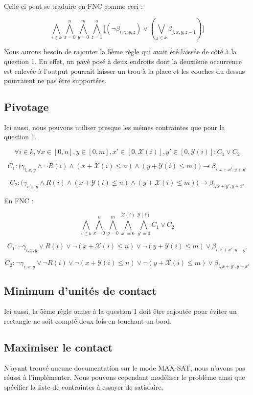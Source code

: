 \documentclass[a4paper]{article}
\begin{document}
Celle-ci peut se traduire en FNC comme ceci :

$$
\bigwedge_{i \in k}
  \bigwedge_{x=0}^{n} \bigwedge_{y=0}^{m} \bigwedge_{z=1}^{o}
  \Big[
  (\lnot \beta_{i, x, y, z}) \lor (\bigvee_{j \in k} \beta_{j, x, y, z-1})
  \Big]
$$

Nous aurons besoin de rajouter la 5ème règle qui avait été laissée de côté à la question 1. En effet, un pavé posé à deux endroits dont la deuxième occurrence est enlevée à l'output pourrait laisser un trou à la place et les couches du dessus pourraient ne pas être supportées.

\subsection{Pivotage}

Ici aussi, nous pouvons utiliser presque les mêmes contraintes que pour la question 1.

$$
\forall i \in k,
\forall x \in [0, n] , y \in [0, m],
x' \in [0, \mathcal{X}(i)], y' \in [0, \mathcal{Y}(i)] : C_1 \lor C_2
$$

$$
C_1 : \Big(
\gamma_{i, x, y} \land \lnot R(i)
\land (x + \mathcal{X}(i) \leq n)
\land (y + \mathcal{Y}(i) \leq m)
\Big)
\rightarrow \beta_{i, x + x', y + y'}
$$

$$
C_2 : \Big(
\gamma_{i, x, y} \land R(i)
\land (x + \mathcal{Y}(i) \leq n)
\land (y + \mathcal{X}(i) \leq m)
\Big)
\rightarrow \beta_{i, x + y', y + x'}
$$

En FNC :

$$
\bigwedge_{i \in k}
\bigwedge_{x=0}^{n} \bigwedge_{y=0}^{m}
\bigwedge_{x'=0}^{\mathcal{X}(i)} \bigwedge_{y'=0}^{\mathcal{Y}(i)} C_1 \lor C_2
$$

$$
C_1 :
\lnot \gamma_{i, x, y} \lor R(i)
\lor \lnot (x + \mathcal{X}(i) \leq n)
\lor \lnot (y + \mathcal{Y}(i) \leq m)
\lor \beta_{i, x + x', y + y'}
$$

$$
C_2 :
\lnot \gamma_{i, x, y} \lor \lnot R(i)
\lor \lnot (x + \mathcal{Y}(i) \leq n)
\lor \lnot (y + \mathcal{X}(i) \leq m)
\lor \beta_{i, x + y', y + x'}
$$


\subsection{Minimum d'unités de contact}

Ici aussi, la 5ème règle omise à la question 1 doit être rajoutée pour éviter un rectangle ne soit compté deux fois en touchant un bord.



\subsection{Maximiser le contact}

N'ayant trouvé aucune documentation sur le mode MAX-SAT, nous n'avons pas réussi à l'implémenter.
Nous pouvons cependant modéliser le problème ainsi que spécifier la liste de contraintes à essayer de satisfaire.
\end{document}
